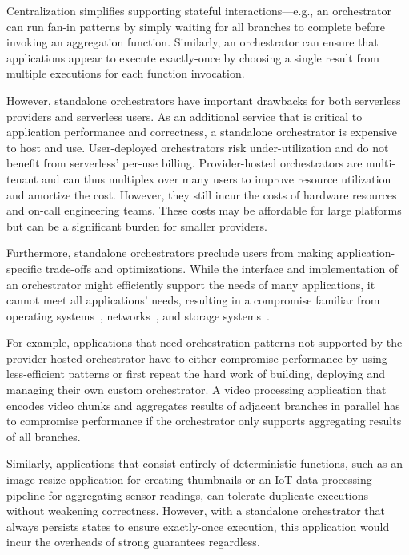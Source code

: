 Centralization simplifies supporting stateful interactions---e.g., an
orchestrator can run fan-in patterns by simply waiting for all branches to
complete before invoking an aggregation function. Similarly, an orchestrator
can ensure that applications appear to execute exactly-once by choosing a
single result from multiple executions for each function invocation.

However, standalone orchestrators have important drawbacks for both serverless
providers and serverless users. As an additional service that is critical to
application performance and correctness, a standalone orchestrator is
expensive to host and use. User-deployed orchestrators risk under-utilization
and do not benefit from serverless' per-use billing. Provider-hosted
orchestrators are multi-tenant and can thus multiplex over many users to
improve resource utilization and amortize the cost. However, they still incur
the costs of hardware resources and on-call engineering teams. These costs may
be affordable for large platforms but can be a significant burden for smaller
providers.

Furthermore, standalone orchestrators preclude users from making
application-specific trade-offs and optimizations. While the interface and
implementation of an orchestrator might efficiently support the needs of many
applications, it cannot meet all applications' needs, resulting in a
compromise familiar from operating systems~\cite{exokernel,spin},
networks~\cite{active-networks,sdn}, and storage
systems~\cite{comet,splinter}.

For example, applications that need orchestration patterns not supported by
the provider-hosted orchestrator have to either compromise performance by
using less-efficient patterns or first repeat the hard work of building,
deploying and managing their own custom orchestrator. A video processing
application that encodes video chunks and aggregates results of adjacent
branches in parallel has to compromise performance if the orchestrator only
supports aggregating results of all branches.

Similarly, applications that consist entirely of deterministic functions, such
as an image resize application for creating thumbnails or an IoT data
processing pipeline for aggregating sensor readings, can tolerate duplicate
executions without weakening correctness. However, with a standalone
orchestrator that always persists states to ensure exactly-once execution,
this application would incur the overheads of strong guarantees regardless.

